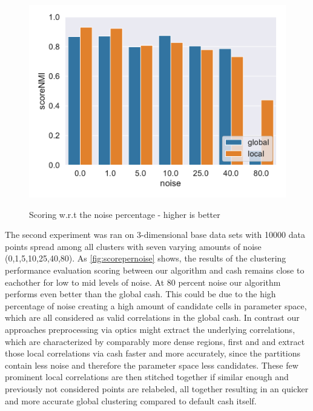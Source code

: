 \begin{figure}[h]
\begin{minipage}[t]{.5\textwidth}
      \includegraphics[width=\textwidth]{evaluation/per_noise/Best_NMI_3D_O10000_pnoise_bar.pdf}
      \label{fig:nmiperpts}
    \end{minipage}    
    \caption{Scoring w.r.t the noise percentage - higher is better}
    \label{fig:scorepernoise}
\end{figure}
The second experiment was ran on 3-dimensional base data sets with 10000 data points spread among all clusters with seven varying amounts of noise (0,1,5,10,25,40,80).
As \autoref{fig:scorepernoise} shows, the results of the clustering performance evaluation scoring between our algorithm and \gls{cash} remains close to eachother for low to mid levels of noise. At 80 percent noise our algorithm performs even better than the global \gls{cash}. This could be due to the high percentage of noise creating a high amount of candidate cells in parameter space, which are all considered as valid correlations in the global \gls{cash}. In contrast our approaches preprocessing via \gls{optics} might extract the underlying correlations, which are characterized by comparably more dense regions, first and and extract those local correlations via \gls{cash} faster and more accurately, since the partitions contain less noise and therefore the parameter space less candidates. These few prominent local correlations are then stitched together if similar enough and previously not considered points are relabeled, all together resulting in an quicker and more accurate global clustering compared to default \gls{cash} itself.

